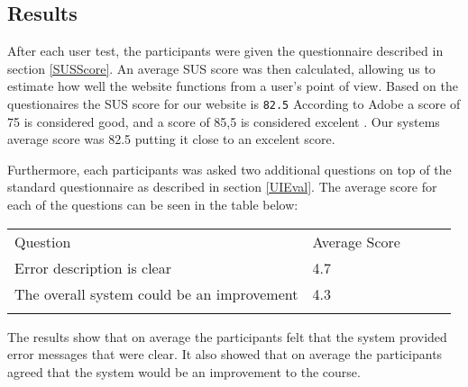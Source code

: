 \subsection*{Results} \label{UiResults}
After each user test, the participants were given the questionnaire described in section \ref{SUSScore}. An average SUS score was then calculated, allowing us to estimate how well the website functions from a user’s point of view. Based on the questionaires the SUS score for our website is \texttt{82.5}
According to Adobe a score of 75 is considered good, and a score of 85,5 is considered excelent \cite{adobeSUS}. Our systems average score was 82.5 putting it close to an excelent score. 

Furthermore, each participants was asked two additional questions on top of the standard questionnaire as described in section \ref{UIEval}. The average score for each of the questions can be seen in the table below:
\begin{table}[H]
\centering
\begin{tabular}{lllll}
\cline{1-2}
\multicolumn{1}{|l|}{\cellcolor[HTML]{C0C0C0}Question}           & \multicolumn{1}{l|}{\cellcolor[HTML]{C0C0C0}Average Score} &  &  &  \\ \cline{1-2}
\multicolumn{1}{|l|}{Error description is clear}                 & \multicolumn{1}{l|}{4.7}                                    &  &  &  \\ \cline{1-2}
\multicolumn{1}{|l|}{The overall system could be an improvement} & \multicolumn{1}{l|}{4.3}                                    &  &  &  \\ \cline{1-2}
                                                                 &                                                           &  &  & 
\end{tabular}
\end{table}
The results show that on average the participants felt that the system provided error messages that were clear. It also showed that on average the participants agreed that the system would be an improvement to the course.